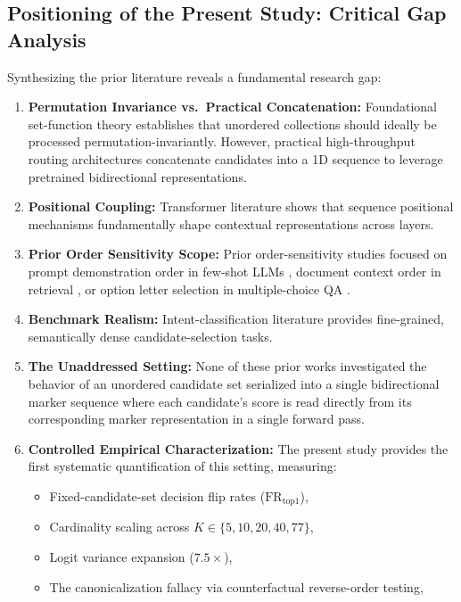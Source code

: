 \documentclass[11pt,a4paper]{article}
\begin{document}
\subsection{Positioning of the Present Study: Critical Gap Analysis}
Synthesizing the prior literature reveals a fundamental research gap:
\begin{enumerate}
    \item \textbf{Permutation Invariance vs.\ Practical Concatenation:} Foundational set-function theory \citep{zaheer2017deep, lee2019set} establishes that unordered collections should ideally be processed permutation-invariantly. However, practical high-throughput routing architectures \citep{laya2024} concatenate candidates into a 1D sequence to leverage pretrained bidirectional representations.
    \item \textbf{Positional Coupling:} Transformer literature \citep{vaswani2017attention, shaw2018self, su2024roformer, dufter2022position} shows that sequence positional mechanisms fundamentally shape contextual representations across layers.
    \item \textbf{Prior Order Sensitivity Scope:} Prior order-sensitivity studies focused on prompt demonstration order in few-shot LLMs \citep{lu2022fantastically, zhao2021calibrate}, document context order in retrieval \citep{liu2024lost}, or option letter selection in multiple-choice QA \citep{pezeshkpour2024large, zheng2024large}.
    \item \textbf{Benchmark Realism:} Intent-classification literature \citep{casanueva2020efficient} provides fine-grained, semantically dense candidate-selection tasks.
    \item \textbf{The Unaddressed Setting:} None of these prior works investigated the behavior of an unordered candidate set serialized into a single bidirectional marker sequence where each candidate's score is read directly from its corresponding marker representation in a single forward pass.
    \item \textbf{Controlled Empirical Characterization:} The present study provides the first systematic quantification of this setting, measuring:
    \begin{itemize}
        \item Fixed-candidate-set decision flip rates ($\mathrm{FR}_{\mathrm{top1}}$),
        \item Cardinality scaling across $K \in \{5, 10, 20, 40, 77\}$,
        \item Logit variance expansion ($7.5\times$),
        \item The canonicalization fallacy via counterfactual reverse-order testing,

\end{itemize}
\end{enumerate}
\end{document}

